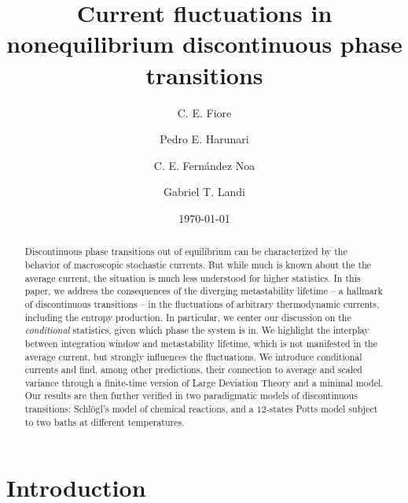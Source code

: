 \documentclass[aps,pre,reprint, amsmath, amssymb,superscriptaddress]{revtex4-1}
\begin{document}
\title{Current fluctuations  in nonequilibrium discontinuous phase transitions}
\author{C. E. Fiore}
\author{Pedro E. Harunari}
\author{C. E. Fern\'andez Noa}

\author{Gabriel T. Landi}

\date{\today} 
\begin{abstract}
Discontinuous phase transitions out of equilibrium can be characterized by the behavior of macroscopic stochastic currents.
But while much is known about the the average current, the situation is much less understood for higher statistics. In this paper, we address
 the consequences of the diverging metastability lifetime -- a hallmark of discontinuous transitions -- in the fluctuations of arbitrary thermodynamic currents, including the entropy production. 
In particular, we center our discussion on the \emph{conditional} statistics, given which phase the system is in.
We highlight the interplay between integration window and metastability lifetime, which is not manifested in the average current, but strongly influences the fluctuations. We introduce conditional currents and find, among other predictions, their connection to average and scaled variance through a finite-time version of Large Deviation Theory and a minimal model.
Our results are then further verified in two paradigmatic models of discontinuous transitions: 
Schl\"ogl's model of chemical reactions, and a  $12$-states Potts model subject to two baths at different temperatures. 
\end{abstract}

\maketitle

%
%
\section{Introduction}
%
%
\end{document}
